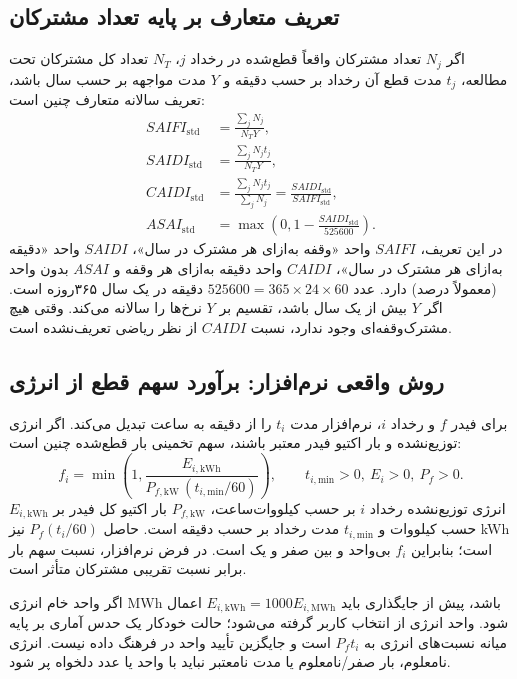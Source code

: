\documentclass[11pt,a4paper,oneside]{book}
\begin{document}
\subsection{تعریف متعارف بر پایه تعداد مشترکان}
اگر $N_j$ تعداد مشترکان واقعاً قطع‌شده در رخداد $j$، $N_T$ تعداد کل مشترکان تحت مطالعه، $t_j$ مدت قطع آن رخداد بر حسب دقیقه و $Y$ مدت مواجهه بر حسب سال باشد، تعریف سالانه متعارف چنین است:
\begin{align}
 SAIFI_{\mathrm{std}}&=\frac{\sum_j N_j}{N_T Y},\label{eq:saifi-standard}\\
 SAIDI_{\mathrm{std}}&=\frac{\sum_j N_j t_j}{N_T Y},\label{eq:saidi-standard}\\
 CAIDI_{\mathrm{std}}&=\frac{\sum_j N_j t_j}{\sum_j N_j}
 =\frac{SAIDI_{\mathrm{std}}}{SAIFI_{\mathrm{std}}},\label{eq:caidi-standard}\\
 ASAI_{\mathrm{std}}&=\max\left(0,1-\frac{SAIDI_{\mathrm{std}}}{525600}\right).
 \label{eq:asai-standard}
\end{align}
در این تعریف، $SAIFI$ واحد «وقفه به‌ازای هر مشترک در سال»، $SAIDI$ واحد «دقیقه به‌ازای هر مشترک در سال»، $CAIDI$ واحد دقیقه به‌ازای هر وقفه و $ASAI$ بدون واحد (معمولاً درصد) دارد. عدد $525600=365\times24\times60$ دقیقه در یک سال ۳۶۵روزه است. اگر $Y$ بیش از یک سال باشد، تقسیم بر $Y$ نرخ‌ها را سالانه می‌کند. وقتی هیچ مشترک‌وقفه‌ای وجود ندارد، نسبت $CAIDI$ از نظر ریاضی تعریف‌نشده است.

\subsection{روش واقعی نرم‌افزار: برآورد سهم قطع از انرژی}
برای فیدر $f$ و رخداد $i$، نرم‌افزار مدت $t_i$ را از دقیقه به ساعت تبدیل می‌کند. اگر انرژی توزیع‌نشده و بار اکتیو فیدر معتبر باشند، سهم تخمینی بار قطع‌شده چنین است:
\begin{equation}
 f_i=\min\left(1,\frac{E_{i,\mathrm{kWh}}}
 {P_{f,\mathrm{kW}}\,(t_{i,\mathrm{min}}/60)}\right),
 \qquad t_{i,\mathrm{min}}>0,\ E_i>0,\ P_f>0.
 \label{eq:service-fraction}
\end{equation}
$E_{i,\mathrm{kWh}}$ انرژی توزیع‌نشده رخداد $i$ بر حسب کیلووات‌ساعت، $P_{f,\mathrm{kW}}$ بار اکتیو کل فیدر بر حسب کیلووات و $t_{i,\mathrm{min}}$ مدت رخداد بر حسب دقیقه است. حاصل $P_f(t_i/60)$ نیز kWh است؛ بنابراین $f_i$ بی‌واحد و بین صفر و یک است. در فرض نرم‌افزار، نسبت سهم بار برابر نسبت تقریبی مشترکان متأثر است.

اگر واحد خام انرژی MWh باشد، پیش از جایگذاری باید $E_{i,\mathrm{kWh}}=1000E_{i,\mathrm{MWh}}$ اعمال شود. واحد انرژی از انتخاب کاربر گرفته می‌شود؛ حالت خودکار یک حدس آماری بر پایه میانه نسبت‌های انرژی به $P_ft_i$ است و جایگزین تأیید واحد در فرهنگ داده نیست. انرژی نامعلوم، بار صفر/نامعلوم یا مدت نامعتبر نباید با واحد یا عدد دلخواه پر شود.
\end{document}
